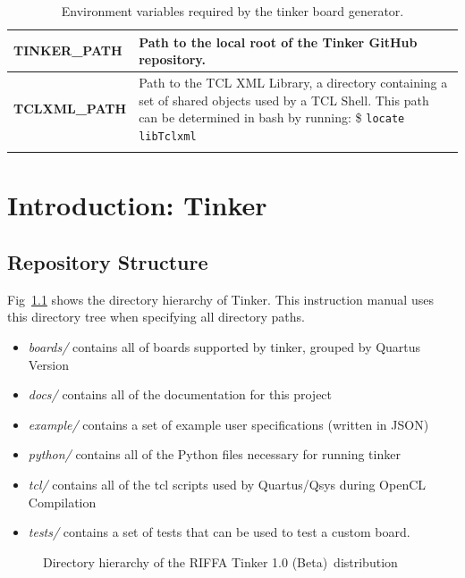 \documentclass{refrep}
\newcommand{\TinkerVersion}{Tinker 1.0 (Beta)}
\newcommand{\Directory}[1]{\textit{#1}}
\newcommand{\EnvVariable}[1]{\textbf{#1}}
\newcommand{\TermCmd}[1]{\$ \texttt{#1}}
\begin{document}
\renewcommand{\arraystretch}{1.5}
\begin{longtable}{|p{3cm}|p{10cm}|}
  \hline

  \EnvVariable{TINKER\_PATH} & Path to the local root of the Tinker GitHub
  repository. \\ \hline

  \EnvVariable{TCLXML\_PATH} & Path to the TCL XML Library, a directory containing a
  set of shared objects used by a TCL Shell. This path can be determined in bash
  by running: \TermCmd{locate libTclxml}\\
  

  \hline
  \caption{Environment variables required by the tinker board generator.}
\end{longtable}


\pagebreak
\chapter{Introduction: Tinker}
\label{Chapter:Intro}
\section{Repository Structure}
\label{Chapter:Intro:Section:Structure}
Fig~\ref{Fig:Tinker:DirStructure} shows the directory hierarchy of Tinker. This
instruction manual uses this directory tree when specifying all directory paths.

\begin{itemize}
\item \Directory{boards/} contains all of boards supported by tinker, grouped by Quartus Version
\item \Directory{docs/} contains all of the documentation for this project
\item \Directory{example/} contains a set of example user specifications (written in JSON)
\item \Directory{python/} contains all of the Python files necessary for running tinker
\item \Directory{tcl/} contains all of the tcl scripts used by Quartus/Qsys during OpenCL Compilation
\item \Directory{tests/} contains a set of tests that can be used to test a custom board. 
\end{itemize}

\begin{figure}[H]
  \caption{Directory hierarchy of the RIFFA \TinkerVersion~distribution} \label{Fig:Tinker:DirStructure}
\end{figure}
\end{document}
